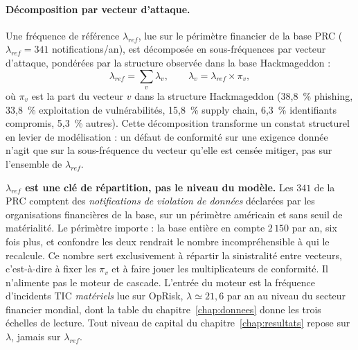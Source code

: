\paragraph{Décomposition par vecteur d'attaque.} Une fréquence de référence
$\lambda_{ref}$, lue sur le périmètre financier de la base PRC
($\lambda_{ref} = 341$ notifications/an), est décomposée en
sous-fréquences par vecteur d'attaque,
pondérées par la structure observée dans la base Hackmageddon :
\begin{equation}
\lambda_{ref} = \sum_{v} \lambda_v,
\qquad
\lambda_v = \lambda_{ref} \times \pi_v,
\end{equation}
où $\pi_v$ est la part du vecteur $v$ dans la structure Hackmageddon
(38{,}8~\% phishing, 33{,}8~\% exploitation de vulnérabilités, 15{,}8~\%
supply chain, 6{,}3~\% identifiants compromis, 5{,}3~\% autres). Cette
décomposition transforme un constat structurel en levier de modélisation :
un défaut de conformité sur une exigence donnée n'agit que sur la
sous-fréquence du vecteur qu'elle est censée mitiger, pas sur l'ensemble de
$\lambda_{ref}$.

\begin{attention}
\textbf{$\lambda_{ref}$ est une clé de répartition, pas le niveau du modèle.} Les $341$ de la
PRC comptent des \emph{notifications de violation de données} déclarées par les organisations
financières de la base, sur un périmètre américain et sans seuil de matérialité. Le périmètre
importe : la base entière en compte $2\,150$ par an, six fois plus, et confondre les deux
rendrait le nombre incompréhensible à qui le recalcule. Ce nombre sert exclusivement à
répartir la sinistralité entre
vecteurs, c'est-à-dire à fixer les $\pi_v$ et à faire jouer les multiplicateurs de conformité.
Il n'alimente pas le moteur de cascade. L'entrée du moteur est la fréquence
d'incidents TIC \emph{matériels} lue sur OpRisk, $\lambda \simeq 21{,}6$ par an au
niveau du secteur financier mondial, dont la table du chapitre~\ref{chap:donnees} donne les
trois échelles de lecture. Tout niveau de capital du chapitre~\ref{chap:resultats} repose sur
$\lambda$, jamais sur $\lambda_{ref}$.
\end{attention}

